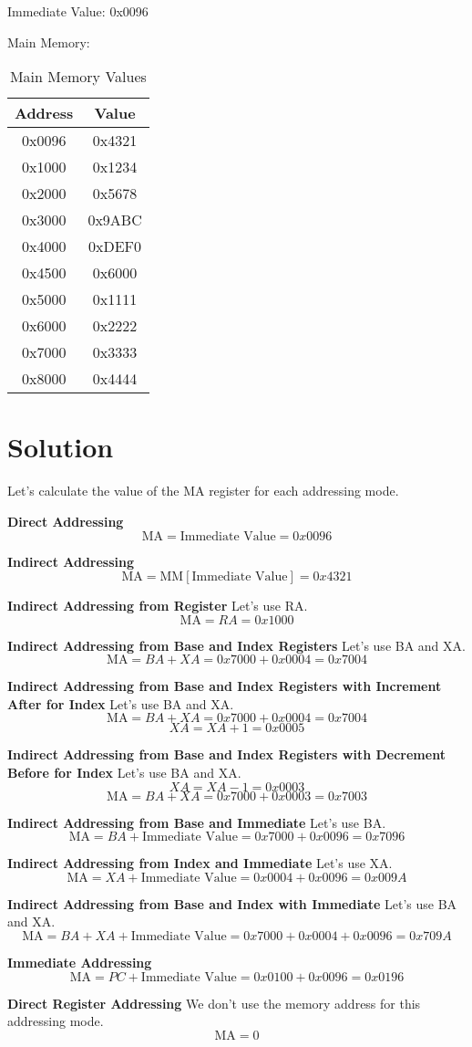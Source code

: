 Immediate Value: 0x0096

Main Memory:
\begin{table}[h!]
    \centering
    \begin{tabular}{|c|c|}
    \hline
    \textbf{Address} & \textbf{Value} \\
    \hline
    0x0096 & 0x4321 \\
    \hline
    0x1000 & 0x1234 \\
    \hline
    0x2000 & 0x5678 \\
    \hline
    0x3000 & 0x9ABC \\
    \hline
    0x4000 & 0xDEF0 \\
    \hline
    0x4500 & 0x6000 \\
    \hline
    0x5000 & 0x1111 \\
    \hline
    0x6000 & 0x2222 \\
    \hline
    0x7000 & 0x3333 \\
    \hline
    0x8000 & 0x4444 \\
    \hline
    \end{tabular}
    \caption{Main Memory Values}
\end{table}

\section*{Solution}
Let's calculate the value of the MA register for each addressing mode.

\textbf{Direct Addressing}
\[
\text{MA} = \text{Immediate Value} = 0x0096
\]

\textbf{Indirect Addressing}
\[
\text{MA} = \text{MM}[\text{Immediate Value}] = 0x4321
\]

\textbf{Indirect Addressing from Register}
Let's use RA.
\[
\text{MA} = RA = 0x1000
\]

\textbf{Indirect Addressing from Base and Index Registers}
Let's use BA and XA.
\[
\text{MA} = BA + XA = 0x7000 + 0x0004 = 0x7004
\]

\textbf{Indirect Addressing from Base and Index Registers with Increment After for Index}
Let's use BA and XA.
\[
\text{MA} = BA + XA = 0x7000 + 0x0004 = 0x7004
\]
\[
XA = XA + 1 = 0x0005
\]

\textbf{Indirect Addressing from Base and Index Registers with Decrement Before for Index}
Let's use BA and XA.
\[
XA = XA - 1 = 0x0003
\]
\[
\text{MA} = BA + XA = 0x7000 + 0x0003 = 0x7003
\]

\textbf{Indirect Addressing from Base and Immediate}
Let's use BA.
\[
\text{MA} = BA + \text{Immediate Value} = 0x7000 + 0x0096 = 0x7096
\]

\textbf{Indirect Addressing from Index and Immediate}
Let's use XA.
\[
\text{MA} = XA + \text{Immediate Value} = 0x0004 + 0x0096 = 0x009A
\]

\textbf{Indirect Addressing from Base and Index with Immediate}
Let's use BA and XA.
\[
\text{MA} = BA + XA + \text{Immediate Value} = 0x7000 + 0x0004 + 0x0096 = 0x709A
\]

\textbf{Immediate Addressing}
\[
\text{MA} = PC + \text{Immediate Value} = 0x0100 + 0x0096 = 0x0196
\]

\textbf{Direct Register Addressing}
We don't use the memory address for this addressing mode.
\[
\text{MA} = 0
\]

